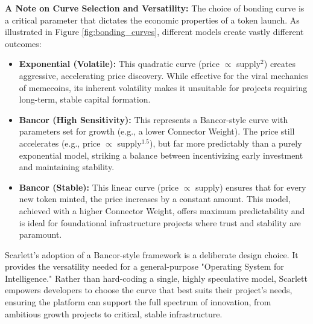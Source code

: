 \documentclass[10pt]{article}
\begin{document}
\begin{itemize}[leftmargin=*, itemsep=2pt]
    \textbf{A Note on Curve Selection and Versatility:} The choice of bonding curve is a critical parameter that dictates the economic properties of a token launch. As illustrated in Figure \ref{fig:bonding_curves}, different models create vastly different outcomes:
    \begin{itemize}[leftmargin=*, itemsep=2pt]
        \item \textbf{Exponential (Volatile):} This quadratic curve (price $\propto$ supply$^2$) creates aggressive, accelerating price discovery. While effective for the viral mechanics of memecoins, its inherent volatility makes it unsuitable for projects requiring long-term, stable capital formation.
        \item \textbf{Bancor (High Sensitivity):} This represents a Bancor-style curve with parameters set for growth (e.g., a lower Connector Weight). The price still accelerates (e.g., price $\propto$ supply$^{1.5}$), but far more predictably than a purely exponential model, striking a balance between incentivizing early investment and maintaining stability.
        \item \textbf{Bancor (Stable):} This linear curve (price $\propto$ supply) ensures that for every new token minted, the price increases by a constant amount. This model, achieved with a higher Connector Weight, offers maximum predictability and is ideal for foundational infrastructure projects where trust and stability are paramount.
    \end{itemize}
    Scarlett's adoption of a Bancor-style framework is a deliberate design choice. It provides the versatility needed for a general-purpose "Operating System for Intelligence." Rather than hard-coding a single, highly speculative model, Scarlett empowers developers to choose the curve that best suits their project's needs, ensuring the platform can support the full spectrum of innovation, from ambitious growth projects to critical, stable infrastructure.

\begin{figure}[H]
\centering
{}
\end{figure}
\end{itemize}
\end{document}
